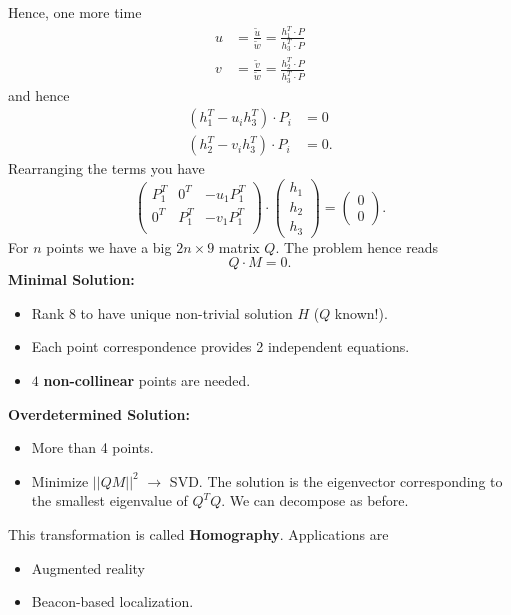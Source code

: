 \documentclass[a4paper,12 pt]{article}
\theoremstyle{definition}
\theoremstyle{remark}
\theoremstyle{definition}
\theoremstyle{definition}
\theoremstyle{definition}
\theoremstyle{remark}
\theoremstyle{definition}
\begin{document}
Hence, one more time
\begin{equation}
\begin{split}
u&=\frac{\tilde{u}}{\tilde{w}}=\frac{h_1^T\cdot P}{h_3^T\cdot P}\\
v&=\frac{\tilde{v}}{\tilde{w}}=\frac{h_2^T\cdot P}{h_3^T\cdot P}
\end{split}
\end{equation}
and hence
\begin{equation}
\begin{split}
(h_1^T-u_ih_3^T)\cdot P_i&=0\\
(h_2^T-v_ih_3^T)\cdot P_i&=0.
\end{split}
\end{equation}
Rearranging the terms you have
\begin{equation}
\begin{pmatrix}
P_1^T &0^T&-u_1P_1^T\\
0^T&P_1^T&-v_1P_1^T\\
\end{pmatrix}\cdot \begin{pmatrix}
 h_1\\
 h_2\\
 h_3
 \end{pmatrix}=\begin{pmatrix}
0\\
0
\end{pmatrix}.
\end{equation}
For $n$ points we have a big $2n \times 9$ matrix $Q$. The problem hence reads
\begin{equation}
Q\cdot M=0.
\end{equation}
\textbf{Minimal Solution:}
\begin{itemize}
\item Rank 8 to have unique non-trivial solution $H$ ($Q$ known!).
\item Each point correspondence provides 2 independent equations.
\item $4$ \textbf{non-collinear} points are needed.
\end{itemize}
\textbf{Overdetermined Solution:}
\begin{itemize}
\item More than 4 points.
\item Minimize $||QM||^2$ $\rightarrow$ SVD. The solution is the eigenvector corresponding to the smallest eigenvalue of $Q^TQ$. We can decompose as before.
\end{itemize}
This transformation is called \textbf{Homography}. Applications are
\begin{itemize}
\item Augmented reality
\item Beacon-based localization.
\end{itemize}
\end{document}
